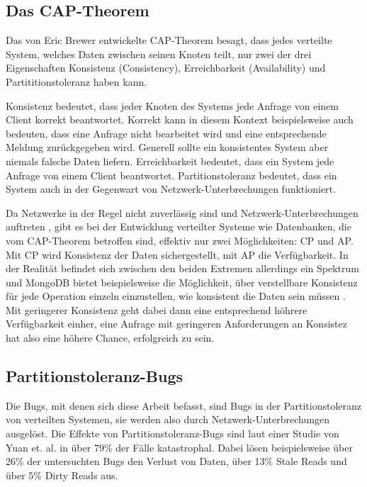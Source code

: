 \documentclass[12pt,a4paper]{report}
\begin{document}
\subsection{Das CAP-Theorem}
Das von Eric Brewer \cite{cap_brewer} entwickelte CAP-Theorem besagt, dass jedes verteilte System, welches Daten zwischen seinen
Knoten teilt, nur zwei der drei Eigenschaften Konsistenz (Consistency), Erreichbarkeit (Availability) und Partititionstoleranz
haben kann.

Konsistenz bedeutet, dass jeder Knoten des Systems jede Anfrage von einem Client korrekt beantwortet. Korrekt kann in diesem
Kontext beispielsweise auch bedeuten, dass eine Anfrage nicht bearbeitet wird und eine entsprechende Meldung zurückgegeben wird.
Generell sollte ein konsistentes System aber niemals falsche Daten liefern. Erreichbarkeit bedeutet, dass ein System jede Anfrage
von einem Client beantwortet. Partitionstoleranz bedeutet, dass ein System auch in der Gegenwart von Netzwerk-Unterbrechungen
funktioniert. \cite{perspectives_on_cap}

Da Netzwerke in der Regel nicht zuverlässig sind und Netzwerk-Unterbrechungen auftreten \cite{the_network_is_reliable}, gibt es
bei der Entwicklung verteilter Systeme wie Datenbanken, die vom CAP-Theorem betroffen sind, effektiv nur zwei Möglichkeiten: CP
und AP. Mit CP wird Konsistenz der Daten sichergestellt, mit AP die Verfügbarkeit. In der Realität befindet sich zwischen den
beiden Extremen allerdings ein Spektrum und MongoDB bietet beispielsweise die Möglichkeit, über verstellbare Konsistenz für jede
Operation einzeln einzustellen, wie konsistent die Daten sein müssen \cite{tunable_consistency_mongo}. Mit geringerer Konsistenz
geht dabei dann eine entsprechend höhrere Verfügbarkeit einher, eine Anfrage mit geringeren Anforderungen an Konsistez hat also
eine höhere Chance, erfolgreich zu sein.

\subsection{Partitionstoleranz-Bugs}
Die Bugs, mit denen sich diese Arbeit befasst, sind Bugs in der Partitionstoleranz von verteilten Systemen, sie werden also durch
Netzwerk-Unterbrechungen ausgelöst. Die Effekte von Partitionstoleranz-Bugs sind laut einer Studie von Yuan et. al.
\cite{simple_testing_can_prevent} in über 79\% der Fälle katastrophal. Dabei lösen beispielsweise über 26\% der untersuchten Bugs
den Verlust von Daten, über 13\% Stale Reads und über 5\% Dirty Reads aus.
\end{document}
